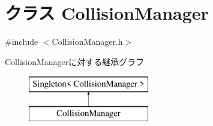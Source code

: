 \hypertarget{class_collision_manager}{\section{クラス Collision\-Manager}
\label{class_collision_manager}
}


{\ttfamily \#include $<$Collision\-Manager.\-h$>$}

Collision\-Managerに対する継承グラフ\begin{figure}[H]
\begin{center}
\leavevmode
\includegraphics[height=2.000000cm]{df/d14/class_collision_manager}
\end{center}
\end{figure}

